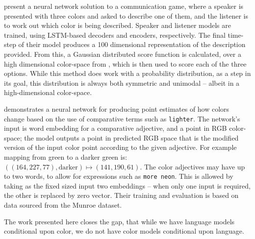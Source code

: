 \documentclass[]{clv3}
\newcommand{\textcite}{\citet}
\newcommand{\natlang}[1]{\texttt{#1}}
\begin{document}
\textcite{DBLP:journals/corr/MonroeHGP17} present a neural network solution to a communication game, where a speaker is presented with three colors and asked to describe one of them, and the listener is to work out which color is being described.
Speaker and listener models are trained, using LSTM-based decoders and encoders, respectively.
The final time-step of their model produces a 100 dimensional representation of the description provided.
From this, a Gaussian distributed score function is calculated, over a high dimensional color-space from \textcite{2016arXiv160603821M}, which is then used to score each of the three options.
While this method does work with a probability distribution, as a step in its goal,
this distribution is always both symmetric and unimodal -- albeit in a high-dimensional color-space.

\textcite{acl2018WinnLighter} demonstrates a neural network for producing point estimates of how colors change based on the use of comparative terms such as \natlang{lighter}.
The network's input is  word embedding for a comparative adjective, and a point in RGB color-space; the model outputs a point in predicted RGB space that is the modified version of the input color point according to the given adjective.
For example mapping from green to a darker green is: $((164,227,77), \text{darker}) \mapsto (141, 190, 61)$.
The color adjectives may have up to two words, to allow for expressions such as \natlang{more neon}.
This is allowed by taking as the fixed sized input two embeddings -- when only one input is required, the other is replaced by zero vector.
Their training and evaluation is based on data sourced from the  Munroe dataset.


The work presented here closes the gap, that while we have language models conditional upon color,
we do not have color models conditional upon language.
\end{document}
